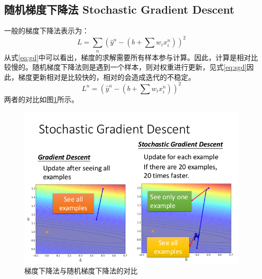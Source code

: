 \subsection{随机梯度下降法 Stochastic Gradient Descent}
一般的梯度下降法表示为：
\begin{equation}\label{eq:gd}
L = \sum _ { n } \left( \hat { y } ^ { n } - \left( b + \sum w _ { i } x _ { i } ^ { n } \right) \right) ^ { 2 }
\end{equation}
从式\eqref{eq:gd}中可以看出，梯度的求解需要所有样本参与计算。因此，计算是相对比较慢的。随机梯度下降法则是遇到一个样本，则对权重进行更新，见式\eqref{eq:sgd}因此，梯度更新相对是比较快的，相对的会造成迭代的不稳定。
\begin{equation}\label{eq:sgd}
L ^ { n } = \left( \hat { y } ^ { n } - \left( b + \sum w _ { i } x _ { i } ^ { n } \right) \right) ^ { 2 }
\end{equation}
两者的对比如图\ref{fig:gd_vs_sgd}所示。
\begin{figure}
	\centering
	\includegraphics[scale=0.5]{pic/gd_vs_sgd}
	\caption{梯度下降法与随机梯度下降法的对比}
	\label{fig:gd_vs_sgd}
\end{figure}
